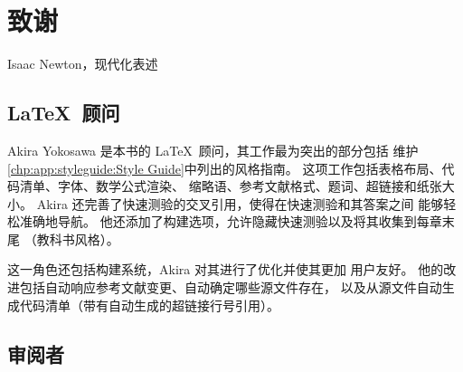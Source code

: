 
\chapter{致谢}
\label{bck:ack:Credits}
%
	 {Isaac Newton，现代化表述}



\section{\LaTeX\ 顾问}

Akira Yokosawa 是本书的 \LaTeX\ 顾问，其工作最为突出的部分包括
维护\cref{chp:app:styleguide:Style Guide}中列出的风格指南。
这项工作包括表格布局、代码清单、字体、数学公式渲染、
缩略语、参考文献格式、题词、超链接和纸张大小。
Akira 还完善了快速测验的交叉引用，使得在快速测验和其答案之间
能够轻松准确地导航。
他还添加了构建选项，允许隐藏快速测验以及将其收集到每章末尾
（教科书风格）。

这一角色还包括构建系统，Akira 对其进行了优化并使其更加
用户友好。
他的改进包括自动响应参考文献变更、自动确定哪些源文件存在，
以及从源文件自动生成代码清单（带有自动生成的超链接行号引用）。

\section{审阅者}

